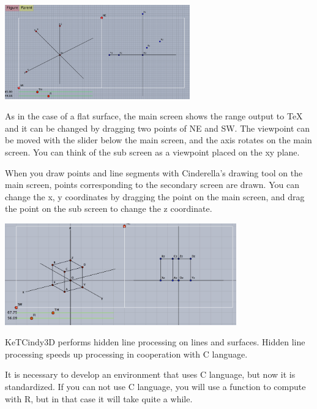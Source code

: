\documentclass[papersize,a4paper,12pt]{article}
\begin{document}
\vspace{\baselineskip}
\begin{center}
 \includegraphics[bb=0 0 879.05 447.02 , width=8cm]{Fig/3dstart.pdf}
\end{center}
As in the case of a flat surface, the main screen shows the range output to TeX and it can be changed by dragging two points of NE and SW. The viewpoint can be moved with the slider below the main screen, and the axis rotates on the main screen. You can think of the sub screen as a viewpoint placed on the xy plane.

When you draw points and line segments with Cinderella's drawing tool on the main screen, points corresponding to the secondary screen are drawn. You can change the x, y coordinates by dragging the point on the main screen, and drag the point on the sub screen to change the z coordinate.

\vspace{\baselineskip}
\begin{center}
 \includegraphics[bb=0.00 0.00 863.04 378.52 , width=10cm]{Fig/3dscreen.pdf}
\end{center}
KeTCindy3D performs hidden line processing on lines and surfaces. Hidden line processing speeds up processing in cooperation with C language.

It is necessary to develop an environment that uses C language, but now it is standardized. If you can not use C language, you will use a function to compute with R, but in that case it will take quite a while.
\end{document}
